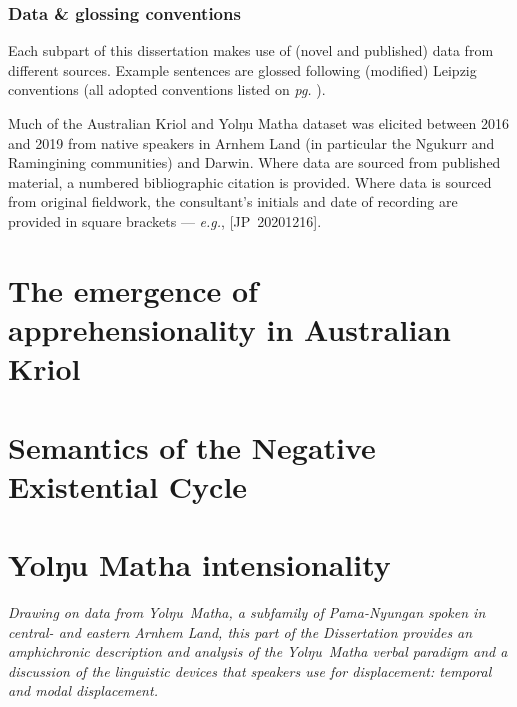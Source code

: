 \documentclass[12pt,dvipsnames]{report}
\begin{document}
\section{Data \& glossing conventions}

Each subpart of this dissertation makes use of (novel and published) data from different sources. Example sentences are glossed following (modified) Leipzig conventions (all adopted conventions listed on \textit{pg.} \pageref{}).

Much of the Australian Kriol and Yolŋu Matha dataset was elicited between 2016 and 2019 from native speakers in Arnhem Land (in particular the Ngukurr and Ramingining communities) and Darwin. Where data are sourced from published material, a numbered bibliographic citation is provided. Where data is sourced from original fieldwork, the consultant's initials and date of recording are provided in square brackets --- \textit{e.g.}, [JP~20201216].

\part{The emergence of apprehensionality in Australian Kriol}\label{bambai}
% 



%

\part{Semantics of the Negative Existential Cycle}\label{NEC}



%



\iffalse
	\part{Yolŋu Matha intensionality}\label{yolngu}
	
		\noindent\sl Drawing on data from Yolŋu~Matha, a subfamily of Pama-Nyungan spoken in central- and eastern Arnhem Land, this part of the Dissertation provides an amphichronic description and analysis of the Yolŋu~Matha verbal paradigm and a discussion of the linguistic devices that speakers use for displacement: temporal and modal displacement.
		
\end{document}

